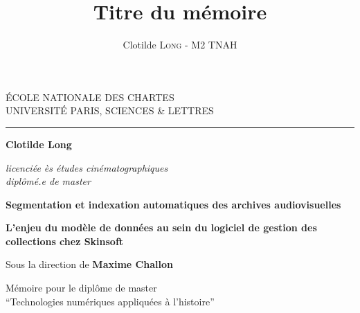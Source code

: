 \documentclass[12pt,twoside]{book}
\author{Clotilde \textsc{Long} - M2 TNAH}
\title{Titre du mémoire}
\begin{document}
	\begin{titlepage}
		\begin{center}
			
			\bigskip
			
			\begin{large}				
				ÉCOLE NATIONALE DES CHARTES\\
				UNIVERSITÉ PARIS, SCIENCES \& LETTRES
			\end{large}
			\begin{center}\rule{2cm}{0.02cm}\end{center}
			
			\bigskip
			\bigskip
			\bigskip
			\begin{Large}
				\textbf{Clotilde Long}\\
			\end{Large}
			\begin{normalsize} \textit{licenciée ès études cinématographiques}\\
				\textit{diplômé.e de master}
			\end{normalsize}
			
			\bigskip
			\bigskip
			\bigskip
			
			\begin{Huge}
				\textbf{Segmentation et indexation automatiques des archives audiovisuelles}\\
			\end{Huge}
			\bigskip
			\bigskip
			\begin{LARGE}
				\textbf{L'enjeu du modèle de données au sein du logiciel de gestion des collections chez Skinsoft}\\
			\end{LARGE}
			
			\bigskip
			\bigskip
			\bigskip
			\begin{large}
				Sous la direction de \textbf{Maxime Challon}
			\end{large}
			\vfill
			
			\begin{large}
				Mémoire 
				pour le diplôme de master \\
				\enquote{Technologies numériques appliquées à l'histoire} \\
			\end{large}
			
		\end{center}
	\end{titlepage}

	\thispagestyle{empty}	
	\cleardoublepage
	
\end{document}
